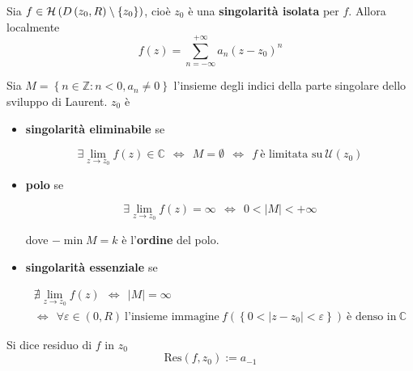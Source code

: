 \Soluzione
\begin{thm}
Sia $f\in \mathcal{H} \left( D\left( z_{0} ,R\right) \setminus \left\{z_{0}\right\}\right)$, cioè $z_{0}$ è una \textbf{singolarità isolata} per $f$. Allora localmente
\begin{equation*}
f\left( z\right) =\sum\limits ^{+\infty }_{n=-\infty } a_{n}\left( z-z_{0}\right)^{n}
\end{equation*}
\end{thm}
\begin{thm}
Sia $M=\left\{n\in \mathbb{Z} :n< 0,a_{n} \neq 0\right\}$ l'insieme degli indici della parte singolare dello sviluppo di Laurent. $z_{0}$ è

\begin{itemize}
\item \textbf{singolarità eliminabile} se

\begin{equation*}
\exists \lim\limits _{z\rightarrow z_{0}} f\left( z\right) \in \mathbb{C} \ \ \iff \ \ M=\emptyset \ \ \iff \ \ f\ \text{è limitata su} \ \mathcal{U}\left( z_{0}\right)
\end{equation*}
\item \textbf{polo} se

\begin{equation*}
\exists \lim\limits _{z\rightarrow z_{0}} f\left( z\right) =\infty \ \ \iff \ \ 0< \left| M\right| < +\infty 
\end{equation*}

dove $-\min M=k$ è l'\textbf{ordine} del polo.
\item \textbf{singolarità essenziale} se

\begin{gather*}
\nexists \lim\limits _{z\rightarrow z_{0}} f\left( z\right) \ \ \iff \ \ \left| M\right| =\infty \\
\iff \ \ \forall \varepsilon \in \left( 0,R\right) \ \text{l'insieme immagine} \ f\left(\left\{0< \left| z-z_{0}\right| < \varepsilon \right\}\right) \ \text{è denso in} \ \mathbb{C}
\end{gather*}
\end{itemize}
\end{thm}
\begin{defn}
Si dice residuo di $f$ in $z_{0}$
\begin{equation*}
\mathrm{Res}\left( f,z_{0}\right) :=a_{-1}
\end{equation*}
\end{defn}
